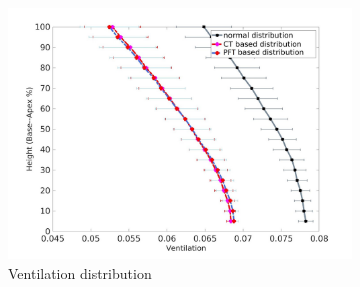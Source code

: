 \begin{figure}[htbp]  
\centering
\begin{subfigure}{.6\linewidth}%
  \includegraphics[width=\linewidth,trim={{.0\wd0} {.0\wd0} {.0\wd0} {.0\wd0}},clip]{ModelBasedAnalysis/Image/VentilationAgainstLungHeight.jpg} %
  \caption{Ventilation distribution}
  \label{fig:MainVQDistribution-a} 
\end{subfigure} 
\begin{subfigure}{.6\linewidth}%

\end{subfigure}
\end{figure}
